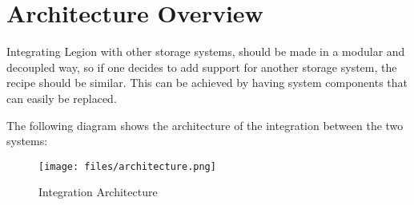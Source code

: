 \section{Architecture Overview}
\label{sec:architecture_overview}
Integrating Legion with other storage systems, should be made in a modular and decoupled way, so if one decides to add support for another storage system, the recipe should be similar. This can be achieved by having system components that can easily be replaced.\par
	The following diagram shows the architecture of the integration between the two systems:
	
\begin{figure}[H]
\centering
\texttt{[image: files/architecture.png]}
\caption{Integration Architecture}
\label{architecture}
\end{figure}

